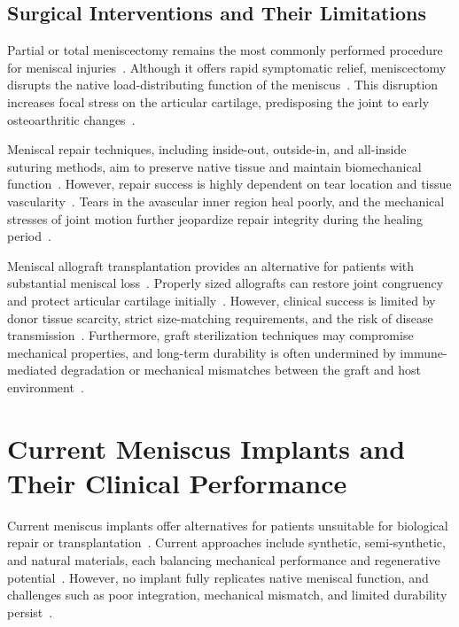 \subsection{Surgical Interventions and Their Limitations}

Partial or total meniscectomy remains the most commonly performed procedure for meniscal injuries~\cite{mordecai2014treatmentmeniscal, kwon2019surgicaltissue, baek2015meniscustissue}. Although it offers rapid symptomatic relief, meniscectomy disrupts the native load-distributing function of the meniscus~\cite{makris2011kneemeniscus, athanasiou2009engineeringknee}. This disruption increases focal stress on the articular cartilage, predisposing the joint to early osteoarthritic changes~\cite{abdelgaied2015comparisonbiomechanical, mordecai2014treatmentmeniscal, ghodbane2019partialmeniscus}.

Meniscal repair techniques, including inside-out, outside-in, and all-inside suturing methods, aim to preserve native tissue and maintain biomechanical function~\cite{kwon2019surgicaltissue, sun2017overviewscaffold}. However, repair success is highly dependent on tear location and tissue vascularity~\cite{athanasiou2009engineeringknee, tran2020comprehensivereview}. Tears in the avascular inner region heal poorly, and the mechanical stresses of joint motion further jeopardize repair integrity during the healing period~\cite{makris2011kneemeniscus, baek2015meniscustissue}.

Meniscal allograft transplantation provides an alternative for patients with substantial meniscal loss~\cite{li2024totalmeniscus, merriam2015successfultotal}. Properly sized allografts can restore joint congruency and protect articular cartilage initially~\cite{beeler2020meniscussizing}. However, clinical success is limited by donor tissue scarcity, strict size-matching requirements, and the risk of disease transmission~\cite{kwon2019surgicaltissue, sun2017overviewscaffold}. Furthermore, graft sterilization techniques may compromise mechanical properties, and long-term durability is often undermined by immune-mediated degradation or mechanical mismatches between the graft and host environment~\cite{ghodbane2019partialmeniscus, baek2015meniscustissue}.

\section{Current Meniscus Implants and Their Clinical Performance}

Current meniscus implants offer alternatives for patients unsuitable for biological repair or transplantation~\cite{kwon2019surgicaltissue, li2024totalmeniscus}. Current approaches include synthetic, semi-synthetic, and natural materials, each balancing mechanical performance and regenerative potential~\cite{sun2017overviewscaffold, gupta2020meniscaltissue}. However, no implant fully replicates native meniscal function, and challenges such as poor integration, mechanical mismatch, and limited durability persist~\cite{baek2015meniscustissue, ghodbane2019partialmeniscus}.

